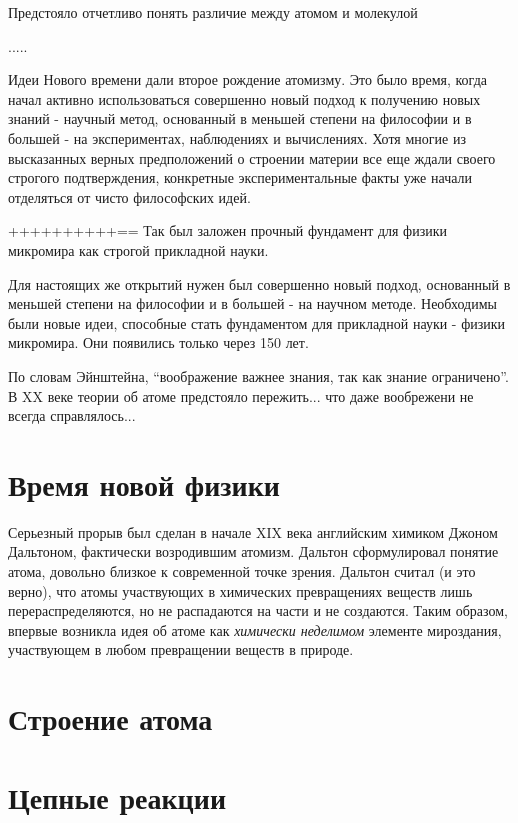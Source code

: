 Предстояло отчетливо понять различие между атомом и молекулой

.....



Идеи Нового времени дали второе рождение атомизму.
Это было время, когда начал активно использоваться совершенно новый подход к получению новых знаний - научный метод, основанный в меньшей степени на философии и в большей - на экспериментах, наблюдениях и вычислениях.
Хотя многие из высказанных верных предположений о строении материи все еще ждали своего строгого подтверждения, конкретные экспериментальные факты уже начали отделяться от чисто философских идей.

++++++++++==
Так был заложен прочный фундамент для физики микромира как строгой прикладной науки. 


Для настоящих же открытий нужен был совершенно новый подход, основанный в меньшей степени на философии и в большей - на научном методе. 
Необходимы были новые идеи, способные стать фундаментом для прикладной науки - физики микромира. 
Они появились только через 150 лет.

По словам Эйнштейна, ``воображение важнее знания, так как знание ограничено''.
В XX веке теории об атоме предстояло пережить... что даже вообрежени не всегда справлялось...


\section*{Время новой физики}

Серьезный прорыв был сделан в начале XIX века английским химиком Джоном Дальтоном, фактически возродившим атомизм. 
Дальтон сформулировал понятие атома, довольно близкое к современной точке зрения. 
Дальтон считал (и это верно), что атомы участвующих в химических превращениях веществ лишь перераспределяются, но не распадаются на части и не создаются. 
Таким образом, впервые возникла идея об атоме как \textit{химически неделимом} элементе мироздания, участвующем в любом превращении веществ в природе.


\section*{Строение атома}


\section*{Цепные реакции}


